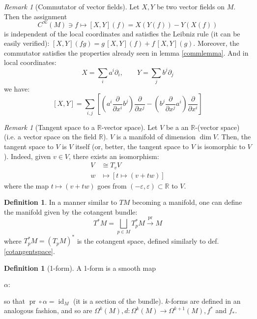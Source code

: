 \documentclass[a4paper,11pt,titlepage, article, oneside]{memoir}
\numberwithin{equation}{section}
\theoremstyle{definition}
\newtheorem{definition}[theorem]{Definition}
\theoremstyle{remark}
\newtheorem{remark}[theorem]{Remark}
\DeclareMathOperator{\id}{id}
\DeclareMathOperator{\pr}{pr}
\newcommand{\rfield}{\mathbb{R}}
\newcommand{\deonde}[1]{\frac{\partial}{\partial {#1}}}
\begin{document}
\begin{remarkbox}\begin{remark} [Commutator of vector fields]
Let $X, Y$ be two vector fields on $M$. Then the assignment 
\begin{equation*}
C^{\infty}(M) \ni f \longmapsto [X, Y](f) = X \left(Y(f)\right) - Y \left(X(f)\right)
\end{equation*}
is independent of the local coordinates  and satisfies the Leibniz rule (it can be easily verified): $[X, Y](fg) = g\, [X, Y](f) + f \, [X, Y](g)$. Moreover, the commutator satisfies the properties already seen in lemma \ref{commlemma}. And in local coordinates: 
$$X= \sum\limits_i a^i \partial_i, \qquad Y= \sum\limits_j b^j \partial_j$$
we have:
$$[X, Y] = \sum\limits_{i, j}\left[ \left (a^i \deonde{x^i} b^j \right) \deonde{x^j} - \left(b^j \deonde{x^j}a^i \right) \deonde{x^i} \right]$$
\end{remark}\end{remarkbox}

\begin{remarkbox}\begin{remark}[Tangent space to a $\rfield$-vector space]
Let $V$ be a an $\rfield$-(vector space) (i.e. a vector space on the field $\rfield$). $V$ is a manifold of dimension $\dim V$. Then, the tangent space to $V$ is $V$ itself (or, better, the tangent space to $V$ is isomorphic to $V$). Indeed, given $v \in V$, there exists an isomorphism:
\begin{align*}
V &\cong T_v V \\
w &\mapsto \left[ t \mapsto (v + tw)\right]
\end{align*}
where the map $t \mapsto (v + tw)$ goes from $(-\varepsilon, \varepsilon) \subset \rfield$ to $V$.
\end{remark}\end{remarkbox}

\begin{definition}
In a manner similar to $TM$ becoming a manifold, one can define the manifold given by the cotangent bundle:
\begin{equation}
T^*M = \bigsqcup_{p \in M} T_p^*M \overset{\pr}{\longrightarrow} M
\end{equation}
where $T^*_pM = (T_pM)^*$ is the cotangent space, defined similarly to def. \ref{cotangentspace}.
\end{definition}

\begin{definition}[1-form]
A 1-form is a smooth map 
\begin{center}
$\alpha \colon$
\end{center}
so that $\pr \circ \alpha = \id_M$ (it is a section of the bundle). $k$-forms are defined in an analogous fashion, and so are $\Omega^k(M), d \colon \Omega^k(M) \rightarrow \Omega^{k+1}(M), f^*$ and $f_*$.
\end{definition}
\end{document}
